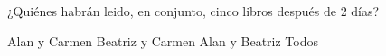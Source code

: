  ¿Quiénes habr\'an leido, en conjunto, cinco libros despu\'es de 2 d\'ias?

\begin{choices}
    \CorrectChoice Alan y Carmen
    \choice Beatriz y Carmen
    \choice Alan y Beatriz
    \choice Todos
\end{choices}